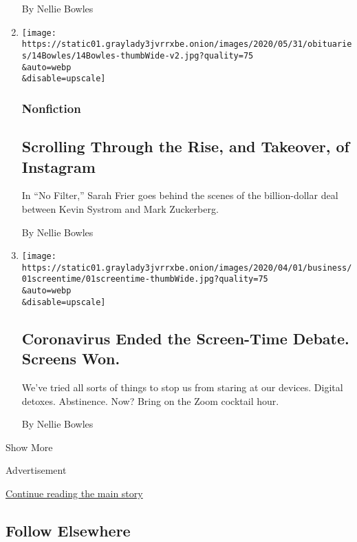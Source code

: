\begin{enumerate}
  By Nellie Bowles
\item
  \href{/2020/04/14/books/review/no-filter-instagram-sarah-frier.html}{}

  \texttt{[image: https://static01.graylady3jvrrxbe.onion/images/2020/05/31/obituaries/14Bowles/14Bowles-thumbWide-v2.jpg?quality=75\\\&auto=webp\\\&disable=upscale]}

  \hypertarget{nonfiction}{%
  \subsubsection{Nonfiction}\label{nonfiction}}

  \hypertarget{scrolling-through-the-rise-and-takeover-of-instagram}{%
  \subsection{Scrolling Through the Rise, and Takeover, of
  Instagram}\label{scrolling-through-the-rise-and-takeover-of-instagram}}

  In ``No Filter,'' Sarah Frier goes behind the scenes of the
  billion-dollar deal between Kevin Systrom and Mark Zuckerberg.

  By Nellie Bowles
\item
  \href{/2020/03/31/technology/coronavirus-screen-time.html}{}

  \texttt{[image: https://static01.graylady3jvrrxbe.onion/images/2020/04/01/business/01screentime/01screentime-thumbWide.jpg?quality=75\\\&auto=webp\\\&disable=upscale]}

  \hypertarget{coronavirus-ended-the-screen-time-debate-screens-won}{%
  \subsection{Coronavirus Ended the Screen-Time Debate. Screens
  Won.}\label{coronavirus-ended-the-screen-time-debate-screens-won}}

  We've tried all sorts of things to stop us from staring at our
  devices. Digital detoxes. Abstinence. Now? Bring on the Zoom cocktail
  hour.

  By Nellie Bowles
\end{enumerate}

Show More

Advertisement

\protect\hyperlink{after-mid2}{Continue reading the main story}

\hypertarget{follow-elsewhere}{%
\subsection{Follow Elsewhere}\label{follow-elsewhere}}

